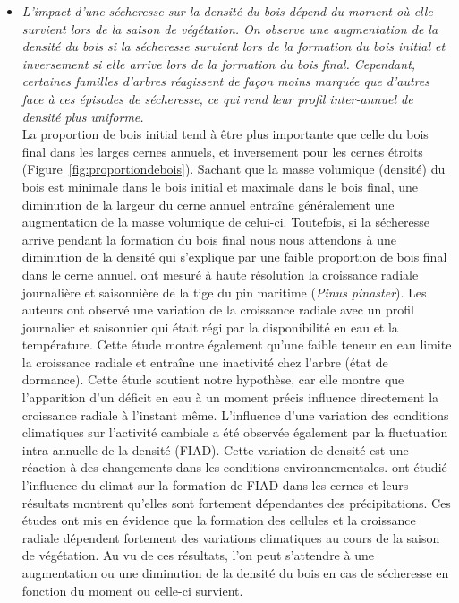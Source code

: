 \documentclass[a4paper,12pt]{report}
\begin{document}
\begin{itemize}	
	

	\item  \emph{L'impact d'une sécheresse sur la densité du bois dépend du moment où elle survient lors de la saison de végétation. On observe une augmentation de la densité du bois si la sécheresse survient lors de la formation du bois initial et inversement si elle arrive lors de la formation du bois final. Cependant, certaines familles d'arbres réagissent de façon moins marquée que d'autres face à ces épisodes de sécheresse, ce qui rend leur profil inter-annuel de densité plus uniforme.} \\
	
	La proportion de bois initial tend à être plus importante que celle du bois final dans les larges cernes annuels, et inversement pour les cernes étroits \citep{Moore2011} (Figure~\ref{fig:proportiondebois}). Sachant que la masse volumique (densité) du bois est minimale dans le bois initial et maximale dans le bois final, une diminution de la largeur du cerne annuel entraîne généralement une augmentation de la masse volumique de celui-ci. Toutefois, si la sécheresse arrive pendant la formation du bois final nous nous attendons à une diminution de la densité qui s'explique par une faible proportion de bois final dans le cerne annuel. \cite{Vieira2013} ont mesuré à haute résolution la croissance radiale journalière et saisonnière de la tige du pin maritime (\textit{Pinus pinaster}). Les auteurs ont observé une variation de la croissance radiale avec un profil journalier et saisonnier qui était régi par la disponibilité en eau et la température. Cette étude montre également qu'une faible teneur en eau limite la croissance radiale et entraîne une inactivité chez l'arbre (état de dormance). Cette étude soutient notre hypothèse, car elle montre que l'apparition d'un déficit en eau à un moment précis influence directement la croissance radiale à l'instant même. L'influence d'une variation des conditions climatiques sur l'activité cambiale a été observée également par la fluctuation intra-annuelle de la densité (FIAD). Cette variation de densité est une réaction à des changements dans les conditions environnementales. \cite{Vieira2015} ont étudié l'influence du climat sur la formation de FIAD dans les cernes et leurs résultats montrent qu'elles sont fortement dépendantes des précipitations. Ces études ont mis en évidence que la formation des cellules et la croissance radiale dépendent fortement des variations climatiques au cours de la saison de végétation. Au vu de ces résultats, l'on peut s'attendre à une augmentation ou une diminution de la densité du bois en cas de sécheresse en fonction du moment ou celle-ci survient.\\

\end{itemize}
\end{document}
